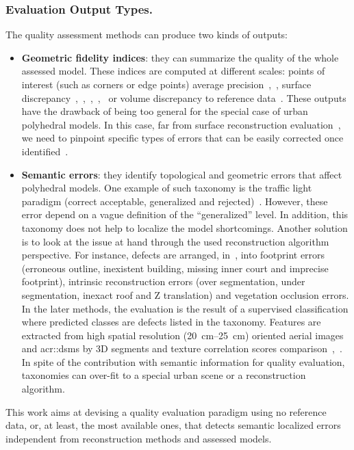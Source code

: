 \documentclass[runningheads]{llncs}
\begin{document}
\subsubsection{Evaluation Output Types.}
The quality assessment methods can produce two kinds of outputs:
\begin{itemize}
    \item \textbf{Geometric fidelity indices}: they can summarize the quality of the whole assessed model. These indices are computed at different scales: points of interest (such as corners or edge points) average precision~\cite{Kaartinen2005},~\cite{Voegtle2003}, surface discrepancy~\cite{Kaartinen2005},~\cite{Henricsson1997},~\cite{Zeng2014},~\cite{Lafarge2012},~\cite{li2016boxfitting} or volume discrepancy to reference data~\cite{Zeng2014}. These outputs have the drawback of being too general for the special case of urban polyhedral models. In this case, far from surface reconstruction evaluation~\cite{berger2013benchmark}, we need to pinpoint specific types of errors that can be easily corrected once identified~\cite{OudeElberink2010}.
    \item \textbf{Semantic errors}: they identify topological and geometric errors that affect polyhedral models. One example of such taxonomy is the traffic light paradigm (correct acceptable, generalized and rejected)~\cite{boudet2006supervised}. However, these error depend on a vague definition of the ``generalized'' level. In addition, this taxonomy does not help to localize the model shortcomings. Another solution is to look at the issue at hand through the used reconstruction algorithm perspective. For instance, defects are arranged, in~\cite{Michelin2013}, into footprint errors (erroneous outline, inexistent building, missing inner court and imprecise footprint), intrinsic reconstruction errors (over segmentation, under segmentation, inexact roof and Z translation) and vegetation occlusion errors. In the later methods, the evaluation is the result of a supervised classification where predicted classes are defects listed in the taxonomy. Features are extracted from high spatial resolution (\SIrange{20}{25}{\cm}) oriented aerial images and \glspl{acr::dsm} by 3D segments and texture correlation scores comparison~\cite{boudet2006supervised},~\cite{Michelin2013}. In spite of the contribution with semantic information for quality evaluation, taxonomies can over-fit to a special urban scene or a reconstruction algorithm.
\end{itemize}

This work aims at devising a quality evaluation paradigm using no reference data, or, at least, the most available ones, that detects semantic localized errors independent from reconstruction methods and assessed models.
\end{document}
